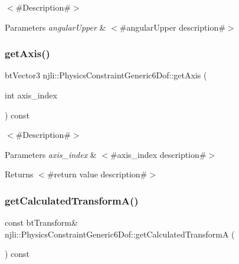 $<$\#\+Description\#$>$


\begin{DoxyParams}{Parameters}
{\em angular\+Upper} & $<$\#angular\+Upper description\#$>$ \\
\hline
\end{DoxyParams}
\mbox{\label{classnjli_1_1_physics_constraint_generic6_dof_a3cada42a66e9341e7fb75e3bedab031b}} 
\subsubsection{\texorpdfstring{get\+Axis()}{getAxis()}}
{\footnotesize\ttfamily bt\+Vector3 njli\+::\+Physics\+Constraint\+Generic6\+Dof\+::get\+Axis (\begin{DoxyParamCaption}\item[{int}]{axis\+\_\+index }\end{DoxyParamCaption}) const}

$<$\#\+Description\#$>$


\begin{DoxyParams}{Parameters}
{\em axis\+\_\+index} & $<$\#axis\+\_\+index description\#$>$\\
\hline
\end{DoxyParams}
\begin{DoxyReturn}{Returns}
$<$\#return value description\#$>$ 
\end{DoxyReturn}
\mbox{\label{classnjli_1_1_physics_constraint_generic6_dof_ae240be2b376857039701ff15e7304c94}} 
\subsubsection{\texorpdfstring{get\+Calculated\+Transform\+A()}{getCalculatedTransformA()}}
{\footnotesize\ttfamily const bt\+Transform\& njli\+::\+Physics\+Constraint\+Generic6\+Dof\+::get\+Calculated\+TransformA (\begin{DoxyParamCaption}{ }\end{DoxyParamCaption}) const}

